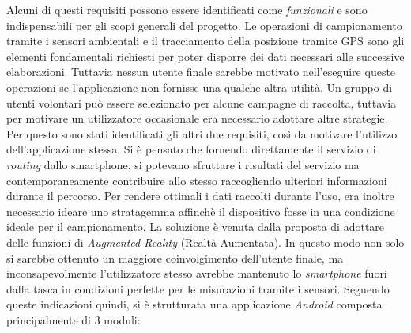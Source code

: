 Alcuni di questi requisiti possono essere identificati come \emph{funzionali} e sono indispensabili per gli scopi generali del progetto. Le operazioni di campionamento tramite i sensori ambientali e il tracciamento della posizione tramite GPS sono gli elementi fondamentali richiesti per poter disporre dei dati necessari alle successive elaborazioni. Tuttavia nessun utente finale sarebbe motivato nell'eseguire queste operazioni se l'applicazione non fornisse una qualche altra utilità. Un gruppo di utenti volontari può essere selezionato per alcune campagne di raccolta, tuttavia per motivare un utilizzatore occasionale era necessario adottare altre strategie. 
Per questo sono stati identificati gli altri due requisiti, così da motivare l'utilizzo dell'applicazione stessa. Si è pensato che fornendo direttamente il servizio di \emph{routing} dallo smartphone, si potevano sfruttare i risultati del servizio ma contemporaneamente contribuire allo stesso raccogliendo ulteriori informazioni durante il percorso. Per rendere ottimali i dati raccolti durante l'uso, era inoltre necessario ideare uno stratagemma affinchè il dispositivo fosse in una condizione ideale per il campionamento. La soluzione è venuta dalla proposta di adottare delle funzioni di \emph{Augmented Reality} (Realtà Aumentata). In questo modo non solo si sarebbe ottenuto un maggiore coinvolgimento dell'utente finale, ma inconsapevolmente l'utilizzatore stesso avrebbe mantenuto lo \emph{smartphone} fuori dalla tasca in condizioni perfette per le misurazioni tramite i sensori.
Seguendo queste indicazioni quindi, si è strutturata una applicazione \emph{Android} composta principalmente di 3 moduli:
